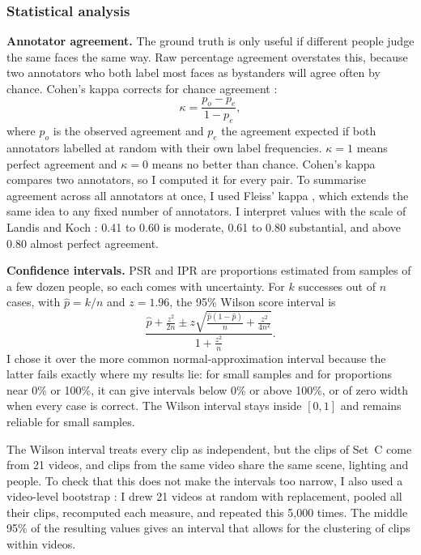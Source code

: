 \subsubsection{Statistical analysis}
\label{sec:stats}

\textbf{Annotator agreement.} The ground truth is only useful if different people judge
the same faces the same way. Raw percentage agreement overstates this, because two
annotators who both label most faces as bystanders will agree often by chance. Cohen's
kappa corrects for chance agreement \cite{cohen1960}:
\begin{equation}
  \kappa = \frac{p_o - p_e}{1 - p_e},
  \label{eq:kappa}
\end{equation}
where $p_o$ is the observed agreement and $p_e$ the agreement expected if both annotators
labelled at random with their own label frequencies. $\kappa = 1$ means perfect agreement
and $\kappa = 0$ means no better than chance. Cohen's kappa compares two annotators, so I
computed it for every pair. To summarise agreement across all annotators at once, I used
Fleiss' kappa \cite{fleiss1971}, which extends the same idea to any fixed number of
annotators. I interpret values with the scale of Landis and Koch \cite{landis1977}: 0.41
to 0.60 is moderate, 0.61 to 0.80 substantial, and above 0.80 almost perfect agreement.

\textbf{Confidence intervals.} PSR and IPR are proportions estimated from samples of a few
dozen people, so each comes with uncertainty. For $k$ successes out of $n$ cases, with
$\hat{p} = k/n$ and $z = 1.96$, the 95\% Wilson score interval \cite{wilson1927} is
\begin{equation}
  \frac{\hat{p} + \frac{z^2}{2n} \pm z\sqrt{\frac{\hat{p}(1-\hat{p})}{n} + \frac{z^2}{4n^2}}}
       {1 + \frac{z^2}{n}}.
  \label{eq:wilson}
\end{equation}
I chose it over the more common normal-approximation interval because the latter fails
exactly where my results lie: for small samples and for proportions near 0\% or 100\%, it can
give intervals below 0\% or above 100\%, or of zero width when every case is correct. The
Wilson interval stays inside $[0, 1]$ and remains reliable for small samples.

The Wilson interval treats every clip as independent, but the clips of Set~C come from 21
videos, and clips from the same video share the same scene, lighting and people. To check
that this does not make the intervals too narrow, I also used a video-level bootstrap
\cite{efron1993}: I drew 21 videos at random with replacement, pooled all their clips,
recomputed each measure, and repeated this 5,000 times. The middle 95\% of the resulting
values gives an interval that allows for the clustering of clips within videos.

